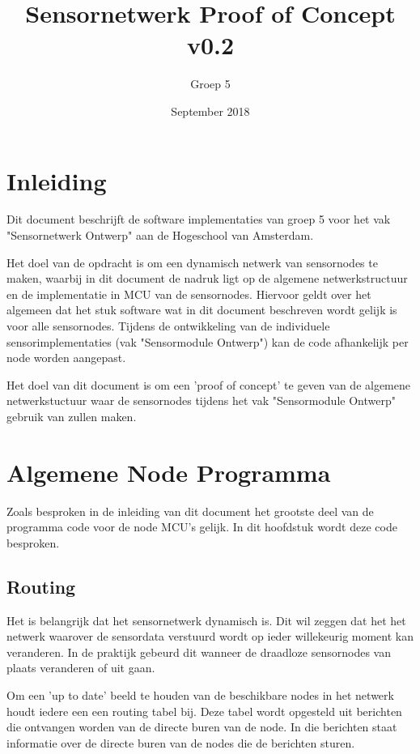 \documentclass[a4paper, 11pt]{article}
\title{Sensornetwerk Proof of Concept v0.2}
\author{Groep 5}
\date{September 2018}
\begin{document}
\maketitle
\clearpage
{}
\clearpage

\section{Inleiding}
Dit document beschrijft de software implementaties van groep 5 voor het vak "Sensornetwerk Ontwerp" aan de Hogeschool van Amsterdam.

Het doel van de opdracht is om een dynamisch netwerk van sensornodes te maken, waarbij in dit document de nadruk ligt op de algemene netwerkstructuur en de implementatie in MCU van de sensornodes. Hiervoor geldt over het algemeen dat het stuk software wat in dit document beschreven wordt gelijk is voor alle sensornodes. Tijdens de ontwikkeling van de individuele sensorimplementaties (vak "Sensormodule Ontwerp") kan de code afhankelijk per node worden aangepast. 

Het doel van dit document is om een 'proof of concept' te geven van de algemene netwerkstuctuur waar de sensornodes tijdens het vak "Sensormodule Ontwerp" gebruik van zullen maken.


\section{Algemene Node Programma}
Zoals besproken in de inleiding van dit document het grootste deel van de programma code voor de node MCU's gelijk. In dit hoofdstuk wordt deze code besproken. 

\subsection{Routing}
Het is belangrijk dat het sensornetwerk dynamisch is. Dit wil zeggen dat het het netwerk waarover de sensordata verstuurd wordt op ieder willekeurig moment kan veranderen. In de praktijk gebeurd dit wanneer de draadloze sensornodes van plaats veranderen of uit gaan. 

Om een 'up to date' beeld te houden van de beschikbare nodes in het netwerk houdt iedere een een routing tabel bij. Deze tabel wordt opgesteld uit berichten die ontvangen worden van de directe buren van de node. In die berichten staat informatie over de directe buren van de nodes die de berichten sturen. 

\end{document}
